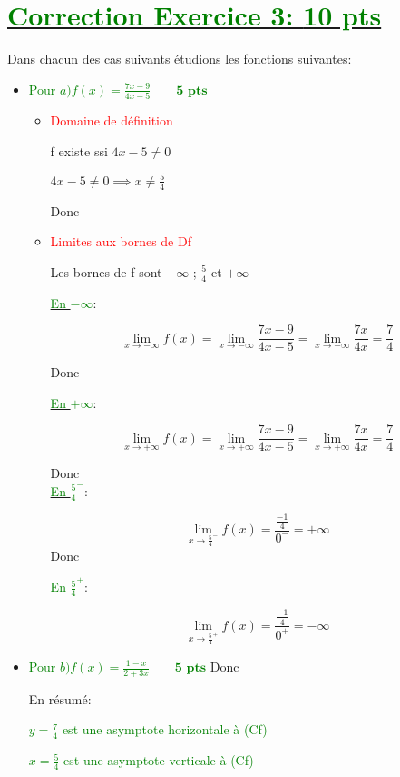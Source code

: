 \documentclass[12pt]{article}
\begin{document}
\section*{\underline{\textcolor{green}{Correction Exercice 3: \textbf{10 pts}}}}
Dans chacun des cas suivants étudions les fonctions suivantes:
\begin{itemize}
\item \textcolor{green}{Pour $a)f(x)=\frac{7x-9}{4x-5}\quad\quad\textbf{5 pts}$}
\begin{itemize}
\item \textcolor{red}{Domaine de définition}

f existe ssi $4x-5\neq 0$

$4x-5\neq 0 \implies x\neq\frac{5}{4}$

Donc \textcolor{green}{}

\item \textcolor{red}{Limites aux bornes de Df}

Les bornes de f sont $-\infty$ ; $\frac{5}{4}$ et $+\infty$

\underline{\textcolor{green}{En $-\infty $}}:

\[\lim_{x \to -\infty}f(x)=\lim_{x \to -\infty}\frac{7x-9}{4x-5}=\lim_{x \to -\infty}\frac{7x}{4x}=\frac{7}{4}\]

Donc \textcolor{green}{}

\underline{\textcolor{green}{En $+\infty $}}:

\[\lim_{x \to +\infty}f(x)=\lim_{x \to +\infty}\frac{7x-9}{4x-5}=\lim_{x \to +\infty}\frac{7x}{4x}=\frac{7}{4}\]

Donc \textcolor{green}{}\\

\underline{\textcolor{green}{En $\frac{5}{4}^{-}$}}:

\[\lim_{x \to \frac{5}{4}^{-}}f(x)=\frac{\frac{-1}{4}}{0^{-}}=+\infty\]
Donc \textcolor{green}{}

\underline{\textcolor{green}{En $\frac{5}{4}^{+}$}}:

\[\lim_{x \to \frac{5}{4}^{+}}f(x)=\frac{\frac{-1}{4}}{0^{+}}=-\infty\]
\end{itemize}
\item \textcolor{green}{Pour $b)f(x)=\frac{1-x}{2+3x}\quad\quad\textbf{5 pts}$}
Donc \textcolor{green}{}

En résumé:

\textcolor{green}{$y=\frac{7}{4}$ est une asymptote horizontale à (Cf)}

\textcolor{green}{$x=\frac{5}{4}$ est une asymptote verticale à (Cf)}
\end{itemize}
\end{document}
